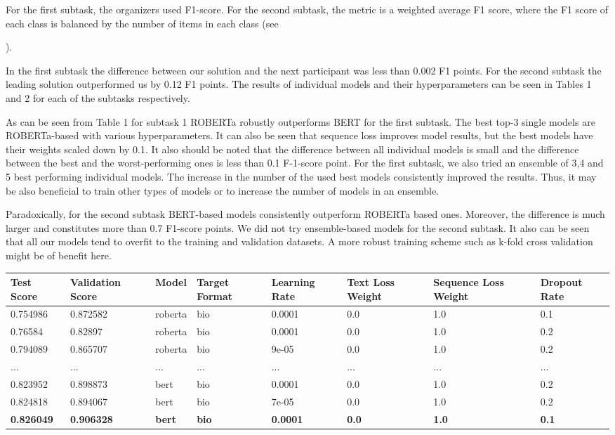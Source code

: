 \documentclass[11pt]{article}
\begin{document}
For the first subtask, the organizers used F1-score. For the second subtask, the metric is a weighted average F1 score, where the F1 score of each class is balanced by the number of items in each class (see {\cite{Mariko-fincausal-2020}).

In the first subtask the difference between our solution and the next participant was less than 0.002 F1 points. For the second subtask the leading solution outperformed us by 0.12 F1 points. The results of individual models and their hyperparameters can be seen in Tables 1 and 2 for each of the subtasks respectively.


As can be seen from Table 1 for subtask 1 ROBERTa robustly outperforms BERT for the first subtask. The best top-3 single models are ROBERTa-based with various hyperparameters. It can also be seen that sequence loss improves model results, but the best models have their weights scaled down by 0.1. It also should be noted that the difference between all individual models is small and the difference between the best and the worst-performing ones is less than 0.1 F-1-score point. For the first subtask, we also tried an ensemble of 3,4 and 5 best performing individual models. The increase in the number of the used best models consistently improved the results. Thus, it may be also beneficial to train other types of models or to increase the number of models in an ensemble.

Paradoxically, for the second subtask BERT-based models consistently outperform ROBERTa based ones. Moreover, the difference is much larger and constitutes more than 0.7 F1-score points. We did not try ensemble-based models for the second subtask. It also can be seen that all our models tend to overfit to the training and validation datasets. A more robust training scheme such as k-fold cross validation might be of benefit here.

\begin{table}
	\centering
	\begin{tabular}{|p{1.5cm}|p{1.5cm}|p{1.5cm}|p{1.5cm}|p{1.5cm}|p{1.5cm}|p{1.5cm}|p{1.5cm}|}
		\hline
		Test Score & Validation Score & Model & Target Format & Learning Rate & Text Loss Weight & Sequence Loss Weight & Dropout Rate \\ 	\hline
		0.754986 & 0.872582 & roberta & bio & 0.0001 & 0.0 & 1.0 & 0.1\\ \hline 0.76584 & 0.82897 & roberta & bio & 0.0001 & 0.0 & 1.0 & 0.2\\ \hline  0.794089 & 0.865707 & roberta & bio & 9e-05 & 0.0 & 1.0 & 0.2\\ \hline\hline
		...&...&...&...&...&...&...&... \\ \hline
		0.823952 & 0.898873 & bert & bio & 0.0001 & 0.0 & 1.0 & 0.2\\ \hline
		0.824818 & 0.894067 & bert & bio & 7e-05 & 0.0 & 1.0 & 0.2\\ \hline
		\textbf{0.826049} & \textbf{0.906328} & \textbf{bert} & \textbf{bio} & \textbf{0.0001} & \textbf{0.0} & \textbf{1.0} & \textbf{0.1}\\\hline\hline
		

\end{tabular}
\end{table}}
\end{document}
